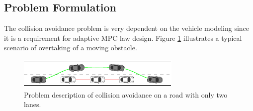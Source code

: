 \documentclass[conference,11pt]{IEEEtran}
\begin{document}
\subsection{Problem Formulation}
The collision avoidance problem is very dependent on the vehicle modeling since it is a requirement for  adaptive MPC law design. Figure \ref{fig:obstacleAvoidance} illustrates a typical scenario of overtaking of a moving obstacle.
\begin{figure}[!h]
	\centering
	\includegraphics[width=\columnwidth]{./figure/obstacleAvoidance/obstacleAvoidance.pdf}
	\caption{Problem description of collision avoidance on a road with only two lanes.}
	\label{fig:obstacleAvoidance}
\end{figure}
\end{document}
